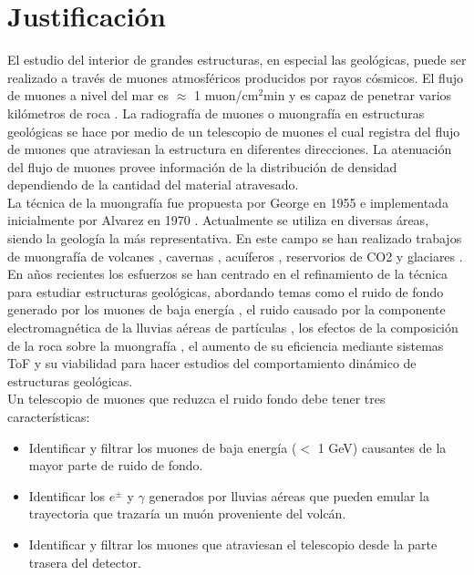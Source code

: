 \chapter{Justificación}

El estudio del interior de grandes estructuras, en especial las geológicas, puede ser realizado a través de muones atmosféricos producidos por rayos cósmicos. El flujo de muones a nivel del mar es $\approx$ 1  muon/cm$^2$min y es capaz de penetrar varios kilómetros de roca \cite{Ariga2018}. La radiografía de muones o muongrafía en estructuras geológicas se hace por medio de un telescopio de muones el cual registra del flujo de muones que atraviesan la estructura en diferentes direcciones. La atenuación del flujo de muones provee información de la distribución de densidad dependiendo de la cantidad del material atravesado.\\

La técnica de la muongrafía fue propuesta por George en 1955 \cite{George1955} e implementada inicialmente por Alvarez en 1970 \cite{Alvarez1970}. Actualmente se utiliza en diversas áreas, siendo la geología la más representativa. En este campo se han realizado trabajos de muongrafía de volcanes \cite{Tanaka2009, Lesparre2012, Carbone2013}, cavernas \cite{Saracino2017, Olh2013}, acuíferos \cite{Jourde2016}, reservorios de CO2 \cite{Zhong2015, Klinger2015, Zhong2016} y glaciares \cite{Nishiyama2017, Ariga2018}.\\

En años recientes los esfuerzos se han centrado en el refinamiento de la técnica para estudiar estructuras geológicas, abordando temas como el ruido de fondo generado por los muones de baja energía \cite{Nishiyama2014,Gomez2017}, el ruido causado por la componente electromagnética de la lluvias aéreas de partículas \cite{KUSAGAYA2015, Nishiyama2014Noise, Marteau2012Noise}, los efectos de la composición de la roca sobre la muongrafía \cite{Lechmann2018}, el aumento de su eficiencia mediante sistemas ToF \cite{Shi2014} y su viabilidad para hacer estudios del comportamiento dinámico de estructuras geológicas\cite{Jourde2016}.\\

Un telescopio de muones que reduzca el ruido fondo debe tener tres características:

\begin{itemize}
    \item Identificar y filtrar los muones de baja energía ($<$ 1 GeV) causantes de la mayor parte de ruido de fondo. 
    \item Identificar los $e^{\pm}$ y $\gamma$ generados por lluvias aéreas que pueden emular la trayectoria que trazaría un muón proveniente del volcán. 
    \item Identificar y filtrar los muones que atraviesan el telescopio desde la parte trasera del detector.
\end{itemize}

